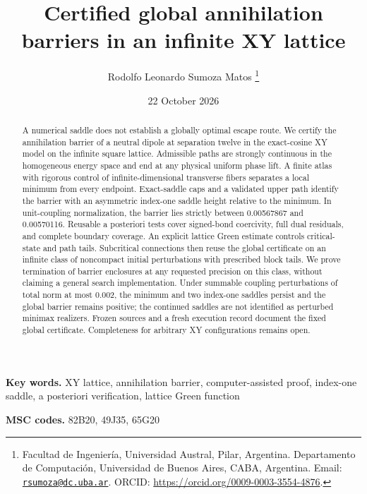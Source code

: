 \documentclass[review,onefignum,onetabnum]{siamonline250211}
\title{Certified global annihilation barriers in an infinite XY lattice}
\author{Rodolfo Leonardo Sumoza Matos%
  \thanks{Facultad de Ingenier\'ia, Universidad Austral, Pilar, Argentina.
    Departamento de Computaci\'on, Universidad de Buenos Aires, CABA, Argentina.
    Email: \href{mailto:rsumoza@dc.uba.ar}{\nolinkurl{rsumoza@dc.uba.ar}}.
    ORCID: \url{https://orcid.org/0009-0003-3554-4876}.}}
\date{22 October 2026}
\theoremstyle{definition}\newtheorem{definition}[theorem]{Definition}
\theoremstyle{remark}\newtheorem{remark}[theorem]{Remark}
\newenvironment{keywords}{\par\smallskip\noindent\textbf{Key words.}}{\par}
\newenvironment{MSCcodes}{\par\smallskip\noindent\textbf{MSC codes.}}{\par}
\begin{document}
\maketitle
\begin{abstract}
A numerical saddle does not establish a globally optimal escape route. We certify the annihilation barrier of a neutral dipole at separation twelve in the exact-cosine XY model on the infinite square lattice. Admissible paths are strongly continuous in the homogeneous energy space and end at any physical uniform phase lift. A finite atlas with rigorous control of infinite-dimensional transverse fibers separates a local minimum from every endpoint. Exact-saddle caps and a validated upper path identify the barrier with an asymmetric index-one saddle height relative to the minimum. In unit-coupling normalization, the barrier lies strictly between 0.00567867 and 0.00570116. Reusable a posteriori tests cover signed-bond coercivity, full dual residuals, and complete boundary coverage. An explicit lattice Green estimate controls critical-state and path tails. Subcritical connections then reuse the global certificate on an infinite class of noncompact initial perturbations with prescribed block tails. We prove termination of barrier enclosures at any requested precision on this class, without claiming a general search implementation. Under summable coupling perturbations of total norm at most 0.002, the minimum and two index-one saddles persist and the global barrier remains positive; the continued saddles are not identified as perturbed minimax realizers. Frozen sources and a fresh execution record document the fixed global certificate. Completeness for arbitrary XY configurations remains open.
\end{abstract}
\begin{keywords}
XY lattice, annihilation barrier, computer-assisted proof, index-one saddle, a posteriori verification, lattice Green function
\end{keywords}
\begin{MSCcodes}
82B20, 49J35, 65G20
\end{MSCcodes}









\appendix


\end{document}
